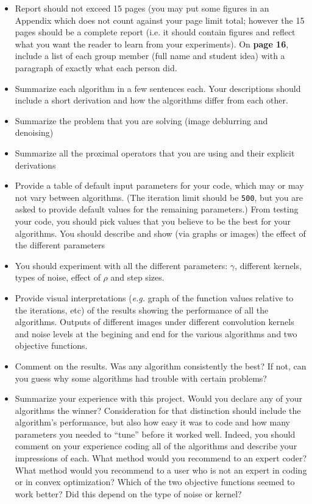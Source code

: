 \documentclass[12pt]{article}
\begin{document}
\begin{itemize}
\item Report should not exceed 15 pages (you may put some figures in an Appendix which does not count against your page limit total; however the 15 pages should be a complete report (i.e. it should contain figures and reflect what you want the reader to learn from your experiments). On \textbf{page 16}, include a list of each group member (full name and student idea) with a paragraph of exactly what each person did. 
  \item Summarize each algorithm in a few sentences each.  Your descriptions should include a short derivation and how the algorithms differ from each other.
  \item Summarize the problem that you are solving (image deblurring and denoising)
  \item Summarize all the proximal operators that you are using and their explicit derivations 
  \item Provide a table of default input parameters for your code, which may or may not vary between algorithms.  (The iteration limit should be \texttt{500}, but you are asked to provide default values for the remaining parameters.)  From testing your code, you should pick values that you believe to be the best for your algorithms. You should describe and show (via graphs or images) the effect of the different parameters
  \item You should experiment with all the different parameters: $\gamma$, different kernels, types of noise, effect of $\rho$ and step sizes. 
\item Provide visual interpretations (\emph{e.g.} graph of the function values relative to the iterations, etc) of the results showing the performance of all the algorithms. Outputs of different images under different convolution kernels and noise levels at the begining and end for the various algorithms and two objective functions. 
  \item Comment on the results.  Was any algorithm consistently the best?  If not, can you guess why some algorithms had trouble with certain problems?
  \item Summarize your experience with this project.  Would you declare any of your algorithms the winner?  Consideration for that distinction should include the algorithm's performance, but also how easy it was to code and how many parameters you needed to ``tune'' before it worked well.  Indeed, you should comment on your experience coding all of the algorithms and describe your impressions of each.  What method would you recommend to an expert coder?  What method would you recommend to a user who is not an expert in coding or in convex optimization? Which of the two objective functions seemed to work better? Did this depend on the type of noise or kernel?
\end{itemize}
\end{document}
